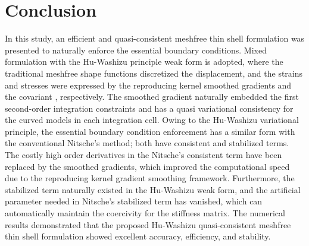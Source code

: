 \section{Conclusion}\label{conclusion}
In this study, an efficient and quasi-consistent meshfree thin shell formulation was presented to naturally enforce the essential boundary conditions.  Mixed formulation with the Hu-Washizu principle weak form is adopted, where the traditional meshfree shape functions discretized the displacement, and the strains and stresses were expressed by the reproducing kernel smoothed gradients and the covariant \DIFdelbegin {}\DIFdelend \DIFaddbegin {}\DIFaddend , respectively. The smoothed gradient naturally embedded the first second-order integration constraints and has a quasi variational consistency for the curved models in each integration cell. Owing to the Hu-Washizu variational principle, the essential boundary condition enforcement has a similar form with the conventional Nitsche’s method; both have consistent and stabilized terms. The costly high order derivatives in the Nitsche’s consistent term have been replaced by the smoothed gradients, which improved the computational speed due to the reproducing kernel gradient smoothing framework. Furthermore, the stabilized term naturally existed in the Hu-Washizu weak form, and the artificial parameter needed in Nitsche’s stabilized term has vanished, which can automatically maintain the coercivity for the stiffness matrix\DIFaddbegin {}\DIFaddend . The numerical results demonstrated that the proposed Hu-Washizu quasi-consistent meshfree thin shell formulation showed excellent accuracy, efficiency, and stability.

